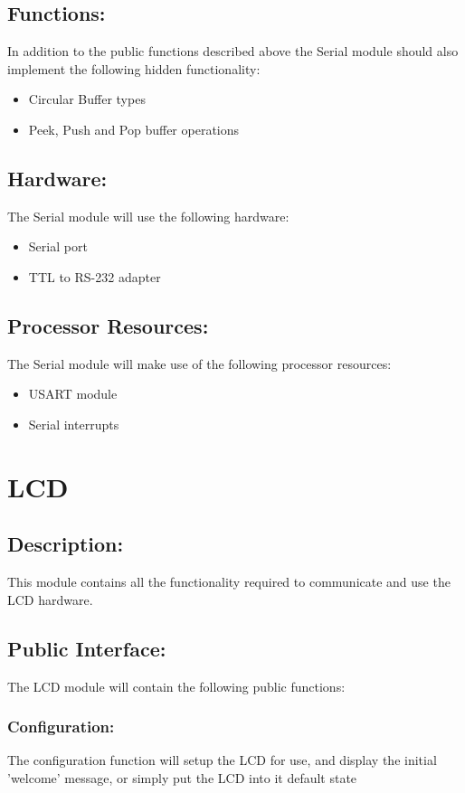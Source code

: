 \documentclass[]{article}
\begin{document}
\subsection{Functions:}
In addition to the public functions described above the Serial module should also implement the following hidden functionality:
\begin{itemize}
	\item Circular Buffer types
	\item Peek, Push and Pop buffer operations
\end{itemize}

\subsection{Hardware:}
The Serial module will use the following hardware:
\begin{itemize}
	\item Serial port
	\item TTL to RS-232 adapter
\end{itemize}

\subsection{Processor Resources:}
The Serial module will make use of the following processor resources:
\begin{itemize}
	\item USART module
	\item Serial interrupts
\end{itemize}

\newpage
\section{LCD}
 
\subsection{Description:}
This module contains all the functionality required to communicate and use the LCD hardware.

\subsection{Public Interface:}
The LCD module will contain the following public functions:

\subsubsection{Configuration:}
The configuration function will setup the LCD for use, and display the initial 'welcome' message, or simply put the LCD into it default state
\end{document}
